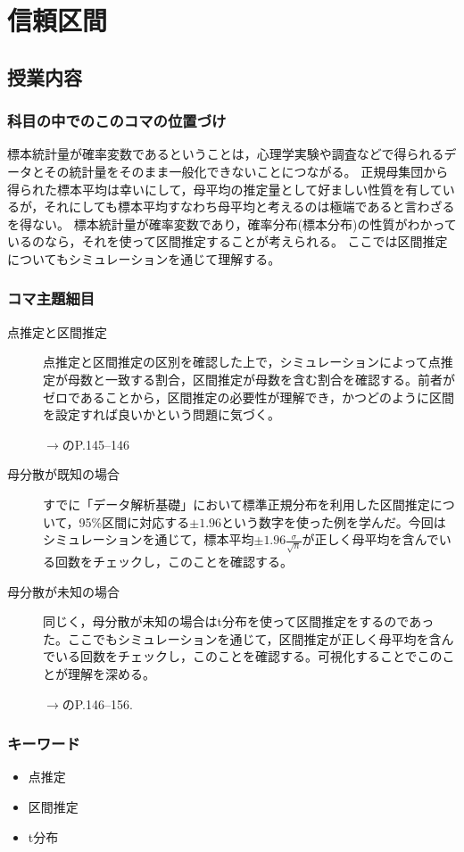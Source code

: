 \section{信頼区間}
\subsection{授業内容}
\subsubsection{科目の中でのこのコマの位置づけ}
標本統計量が確率変数であるということは，心理学実験や調査などで得られるデータとその統計量をそのまま一般化できないことにつながる。
正規母集団から得られた標本平均は幸いにして，母平均の推定量として好ましい性質を有しているが，それにしても標本平均すなわち母平均と考えるのは極端であると言わざるを得ない。
標本統計量が確率変数であり，確率分布(標本分布)の性質がわかっているのなら，それを使って区間推定することが考えられる。
ここでは区間推定についてもシミュレーションを通じて理解する。
\subsubsection{コマ主題細目}
\begin{description}
	\item[点推定と区間推定] 点推定と区間推定の区別を確認した上で，シミュレーションによって点推定が母数と一致する割合，区間推定が母数を含む割合を確認する。前者がゼロであることから，区間推定の必要性が理解でき，かつどのように区間を設定すれば良いかという問題に気づく。
		\begin{flushright}
			$\to$\textcite{kosugi2023}のP.145--146
		\end{flushright}
	\item[母分散が既知の場合] すでに「データ解析基礎」において標準正規分布を利用した区間推定について，95\%区間に対応する$\pm 1.96$という数字を使った例を学んだ。今回はシミュレーションを通じて，標本平均$\pm 1.96\frac{\sigma}{\sqrt{n}}$が正しく母平均を含んでいる回数をチェックし，このことを確認する。
	\item[母分散が未知の場合] 同じく，母分散が未知の場合はt分布を使って区間推定をするのであった。ここでもシミュレーションを通じて，区間推定が正しく母平均を含んでいる回数をチェックし，このことを確認する。可視化することでこのことが理解を深める。
		\begin{flushright}
			$\to$\textcite{kosugi2023}のP.146--156.
		\end{flushright}
\end{description}
\subsubsection{キーワード}
\begin{itemize}
	\item 点推定
	\item 区間推定
	\item t分布
\end{itemize}

